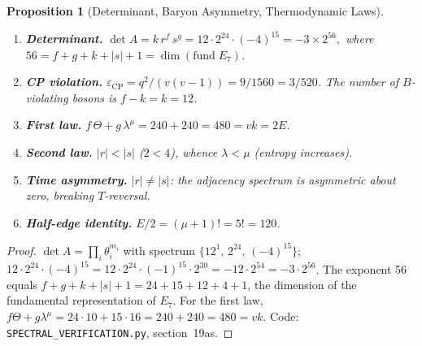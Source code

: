 \documentclass[12pt,a4paper]{article}
\newtheorem{proposition}[theorem]{Proposition}
\begin{document}
\begin{proposition}[Determinant, Baryon Asymmetry, Thermodynamic Laws]
\label{prop:det-thermo}
\begin{enumerate}
\item \textbf{Determinant.}
  $\det A = k\,r^f\,s^g = 12\cdot 2^{24}\cdot(-4)^{15} = -3\times 2^{56},$
  where $56 = f + g + k + |s| + 1 = \dim(\text{fund}\;E_7)$.
\item \textbf{CP violation.}
  $\varepsilon_{\mathrm{CP}} = q^2/(v(v{-}1)) = 9/1560 = 3/520$.
  The number of $B$-violating bosons is $f - k = k = 12$.
\item \textbf{First law.}
  $f\,\Theta + g\,\lambda^\mu = 240 + 240 = 480 = vk = 2E$.
\item \textbf{Second law.}
  $|r| < |s|$ ($2 < 4$), whence $\lambda < \mu$ (entropy increases).
\item \textbf{Time asymmetry.}
  $|r| \neq |s|$: the adjacency spectrum is asymmetric about zero,
  breaking $T$-reversal.
\item \textbf{Half-edge identity.}
  $E/2 = (\mu{+}1)! = 5! = 120$.
\end{enumerate}
\end{proposition}

\begin{proof}
$\det A = \prod_i \theta_i^{m_i}$ with spectrum
$\{12^1,\,2^{24},\,(-4)^{15}\}$;
$12\cdot 2^{24}\cdot(-4)^{15} = 12\cdot 2^{24}\cdot(-1)^{15}\cdot 2^{30}
= -12\cdot 2^{54} = -3\cdot 2^{56}$.
The exponent 56 equals $f+g+k+|s|+1 = 24+15+12+4+1$, the
dimension of the fundamental representation of $E_7$.
For the first law, $f\Theta + g\lambda^\mu = 24\cdot 10 + 15\cdot 16
= 240 + 240 = 480 = vk$.
Code: \texttt{SPECTRAL\_VERIFICATION.py}, section~19as.
\end{proof}
\end{document}
